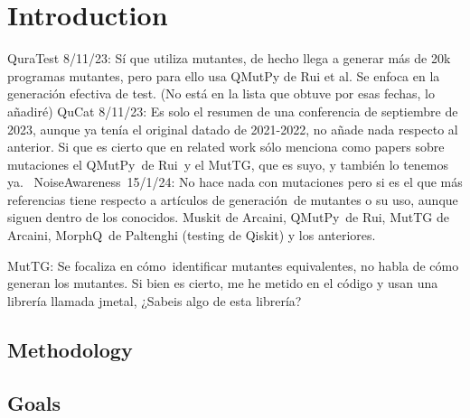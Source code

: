 \cleardoublepage

\chapter{Introduction}
\label{Ch1:Intro}
QuraTest 8/11/23: Sí que utiliza mutantes, de hecho llega a generar más de 20k programas mutantes, pero para ello usa QMutPy de Rui et al. Se enfoca en la generación efectiva de test. (No está en la lista que obtuve por esas fechas, lo añadiré)
QuCat 8/11/23: Es solo el resumen de una conferencia de septiembre de 2023, aunque ya tenía el original datado de 2021-2022, no añade nada respecto al anterior. Si que es cierto que en related work sólo menciona como papers sobre mutaciones el QMutPy de Rui y el MutTG, que es suyo, y también lo tenemos ya. 
NoiseAwareness 15/1/24: No hace nada con mutaciones pero si es el que más referencias tiene respecto a artículos de generación de mutantes o su uso, aunque siguen dentro de los conocidos. Muskit de Arcaini, QMutPy de Rui, MutTG de Arcaini, MorphQ de Paltenghi (testing de Qiskit) y los anteriores.

MutTG: Se focaliza en cómo identificar mutantes equivalentes, no habla de cómo generan los mutantes. Si bien es cierto, me he metido en el código y usan una librería llamada jmetal, ¿Sabeis algo de esta librería?
\section{Methodology}
\label{Ch1.1:TPlat}

\section{Goals}
\label{Ch1.2:TQP}
